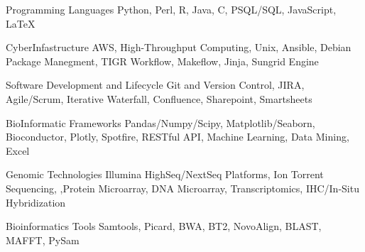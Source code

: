 

\begin{cvskills}

  \cvskill
    {Programming Languages} %
    {Python, Perl, R, Java, C, PSQL/SQL, JavaScript, LaTeX} %

  \cvskill
    {CyberInfastructure} %
    {AWS, High-Throughput Computing, Unix, Ansible, Debian Package Manegment, TIGR Workflow, Makeflow, Jinja, Sungrid Engine} %

  \cvskill
    {Software Development and Lifecycle} %
    {Git and Version Control, JIRA, Agile/Scrum, Iterative Waterfall, Confluence, Sharepoint, Smartsheets} %

  \cvskill
    {BioInformatic Frameworks} %
    {Pandas/Numpy/Scipy, Matplotlib/Seaborn, Bioconductor, Plotly, Spotfire, RESTful API, Machine Learning, Data Mining, Excel} %


  \cvskill
    {Genomic Technologies} %
    {Illumina HighSeq/NextSeq Platforms, Ion Torrent Sequencing, ,Protein Microarray, DNA Microarray, Transcriptomics, IHC/In-Situ Hybridization} %

  \cvskill
    {Bioinformatics Tools} %
    {Samtools, Picard, BWA, BT2, NovoAlign, BLAST, MAFFT, PySam} %




\end{cvskills}
